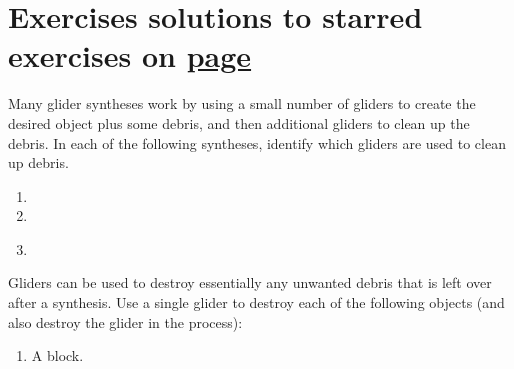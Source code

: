 \section*{Exercises \hfill \normalfont\textsf{\small solutions to starred exercises on \hyperlink{solutions_glider_synthesis}{page \pageref{solutions_glider_synthesis}}}}
\label{sec:synthesis_exercises}
\vspace*{-0.4cm}\hrulefill\vspace*{-0.3cm}\footnotesize\begin{multicols}{2}\vspace*{-0.4cm}\raggedcolumns{}
\setlength{\parskip}{0pt}

\begin{problemstar}\label{exer:glider_cleanup}
	Many glider syntheses work by using a small number of gliders to create the desired object plus some debris, and then additional gliders to clean up the debris. In each of the following syntheses, identify which gliders are used to clean up debris.
	\begin{enumerate}[label=\bf\color{ocre}(\alph*)]
		\item {}
		\item {}
		\item {}\\
	\end{enumerate}
\end{problemstar}


\mfilbreak


\begin{problem}\label{exer:single_glider_cleanup}
	Gliders can be used to destroy essentially any unwanted debris that is left over after a synthesis. Use a single glider to destroy each of the following objects (and also destroy the glider in the process):
	\begin{enumerate}[label=\bf\color{ocre}(\alph*)]
		\item A block.
		

\end{enumerate}
\end{problem}
\end{multicols}
